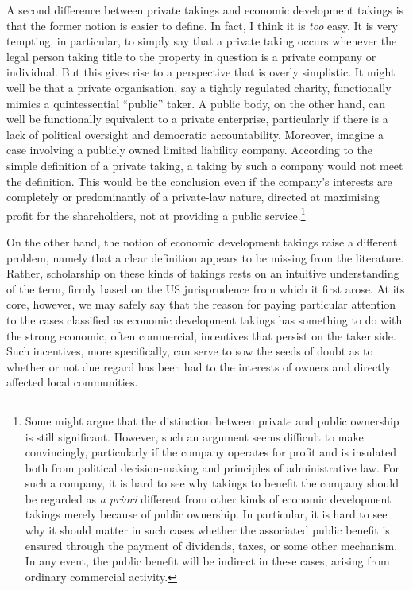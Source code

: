 A second difference between private takings and economic development takings is that the former notion is easier to define. In fact, I think it is {\it too} easy. It is very tempting, in particular, to simply say that a private taking occurs whenever the legal person taking title to the property in question is a private company or individual. But this gives rise to a perspective that is overly simplistic. It might well be that a private organisation, say a tightly regulated charity, functionally mimics a quintessential ``public'' taker. A public body, on the other hand, can well be functionally equivalent to a private enterprise, particularly if there is a lack of political oversight and democratic accountability. Moreover, imagine a case involving a publicly owned limited liability company. According to the simple definition of a private taking, a taking by such a company would not meet the definition. This would be the conclusion even if the company's interests are completely or predominantly of a private-law nature, directed at maximising profit for the shareholders, not at providing a public service.\footnote{Some might argue that the distinction between private and public ownership is still significant. However, such an argument seems difficult to make convincingly, particularly if the company operates for profit and is  insulated both from political decision-making and principles of administrative law. For such a company, it is hard to see why takings to benefit the company should be regarded as {\it a priori} different from other kinds of economic development takings merely because of public ownership. In particular, it is hard to see why it should matter in such cases whether the associated public benefit is ensured through the payment of dividends, taxes, or some other mechanism. In any event, the public benefit will be indirect in these cases, arising from ordinary commercial activity.}

On the other hand, the notion of economic development takings raise a different problem, namely that a 
clear definition appears to be missing from the literature. Rather, scholarship on these kinds of takings rests on an intuitive understanding of the term, firmly based on the US jurisprudence from which it first arose. At its core, however, we may safely say that the reason for paying particular attention to the cases classified as economic development takings has something to do with the strong economic, often commercial, incentives that persist on the taker side. Such incentives, more specifically, can serve to sow the seeds of doubt as to whether or not due regard has been had to the interests of owners and directly affected local communities.

